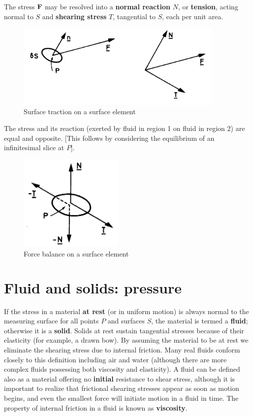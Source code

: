 \documentclass[10pt]{report}
\begin{document}
The stress  ${\bf F}$ may be resolved into a \textbf{normal reaction} $N$, or
\textbf{tension}, acting normal to $S$ and \textbf{shearing stress} $T$,
tangential to $S$, each per unit area.

\begin{figure}[htbp]
\centerline{\includegraphics[width=4in]{Section23.pdf}}
\label{fig2.3}
\caption{ Surface traction on a surface element }
\end{figure}

The stress and its reaction (exerted by fluid in region 1 on fluid in region
2) are equal and opposite. [This follows by considering the equilibrium of
an infinitesimal slice at $P$].

\begin{figure}[htbp]
\centerline{\includegraphics[width=2in]{Section24.pdf}}
\label{fig2.4}
\caption{ Force balance on a surface element }
\end{figure}

\section{Fluid and solids: pressure}
If the stress in a material \textbf{at rest }(or in uniform motion) is
always normal to the measuring surface for all points $P$ and surfaces $S$, the
material is termed a \textbf{fluid}; otherwise it is a \textbf{solid}.
Solids at rest sustain tangential stresses because of their elasticity (for
example, a drawn bow). By assuming the material to be at rest we eliminate
the shearing stress due to internal friction. Many real fluids conform
closely to this definition including air and water (although there are more
complex fluids possessing both viscosity and elasticity). A fluid can be
defined also as a material offering no \textbf{initial} resistance to shear
stress, although it is important to realize that frictional shearing
stresses appear as soon as motion begins, and even the smallest force will
initiate motion in a fluid in time. The property of internal friction in a
fluid is known as \textbf{viscosity}.
\end{document}

